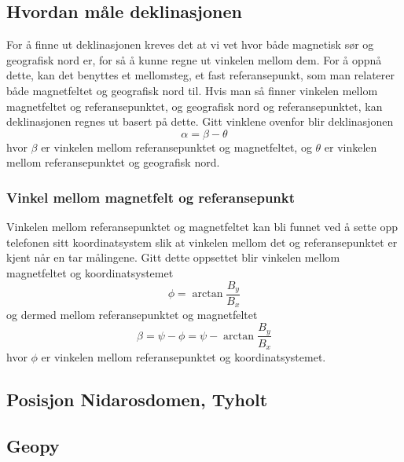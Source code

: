 \subsection{Hvordan måle deklinasjonen}
For å finne ut deklinasjonen kreves det at vi vet hvor både magnetisk sør og 
geografisk nord er, for så å kunne regne ut vinkelen mellom dem. For å oppnå dette, 
kan det benyttes et mellomsteg, et fast referansepunkt, som man relaterer både 
magnetfeltet og geografisk nord til. Hvis man så finner vinkelen mellom magnetfeltet 
og referansepunktet, og geografisk nord og referansepunktet, kan deklinasjonen 
regnes ut basert på dette. Gitt vinklene ovenfor blir deklinasjonen
\begin{equation}
    \alpha = \beta - \theta
\end{equation}
hvor $\beta$ er vinkelen mellom referansepunktet og magnetfeltet, og $\theta$ er vinkelen mellom referansepunktet og geografisk nord.

\subsubsection{Vinkel mellom magnetfelt og referansepunkt}
Vinkelen mellom referansepunktet og magnetfeltet kan bli funnet ved å sette opp 
telefonen sitt koordinatsystem slik at vinkelen mellom det og referansepunktet er 
kjent når en tar målingene. Gitt dette oppsettet blir vinkelen mellom magnetfeltet og koordinatsystemet
\begin{equation}
    \phi = \arctan \frac{B_y}{B_x}
\end{equation}
og dermed mellom referansepunktet og magnetfeltet
\begin{equation}
    \beta = \psi - \phi = \psi - \arctan \frac{B_y}{B_x}
\end{equation}
hvor $\phi$ er vinkelen mellom referansepunktet og koordinatsystemet.

\subsection{Posisjon Nidarosdomen, Tyholt}

\subsection{Geopy}

